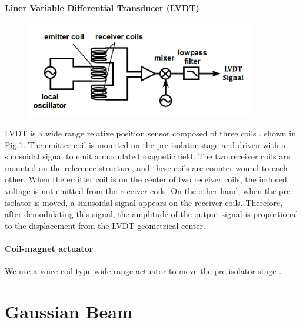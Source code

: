 \subsubsection{Liner Variable Differential Transducer (LVDT)}
\begin{figure}[h]
  \begin{center}   
    \includegraphics[width=10cm]{./img_chap6/img605.png}
    \caption{\cite{sekiguchi2016astudy}}\label{img:img605}
  \end{center}
\end{figure}
LVDT is a wide range relative position sensor composed of three coils \cite{Tariq2002hh}. shown in Fig.\ref{img:img605}. The emitter coil is mounted on the pre-isolator stage and driven with a sinusoidal signal to emit a modulated magnetic field. The two receiver coils are mounted on the reference structure, and these coils are counter-wound to each other. When the emitter coil is on the center of two receiver coils, the induced voltage is not emitted from the receiver coils. On the other hand, when the pre-isolator is moved, a sinusoidal signal appears on the receiver coils. Therefore, after demodulating this signal, the amplitude of the output signal is proportional to the displacement from the LVDT geometrical center.

\subsubsection{Coil-magnet actuator}
We use a voice-coil type wide range actuator to move the pre-isolator stage \cite{wang2002constant}.


\chapter{Gaussian Beam}
